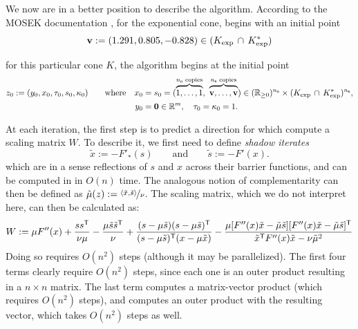 \begin{subappendices}
\begin{lproof}
    We now are in a better position to describe the algorithm.
    According to the MOSEK documentation \parencite{dahl2022primal},
        for the exponential cone,
            begins with an initial point
        \[
            \mathbf v := (1.291, 0.805, -0.828) \in (K_{\exp} \,\cap\, K_{\exp}^*)
        \]

        for this particular cone $K$,
    the algorithm begins at the initial point
    \begin{align*}
        z_0 := (y_0, x_0, \tau_0, s_0, \kappa_0)
        \qquad
                    \text{where}\quad
                x_0 &= s_0 = (\overbrace{\vphantom| 1, \ldots, 1}^{n_{\sf o} \text{ copies}},~
                    \overbrace{\vphantom|
                        \mat v, \ldots, \mat v}^{n_{\sf e}\text{ copies}})
                \in (\mathbb R_{\ge 0})^{n_{\sf o}} \times (K_{\exp} \,\cap\, K_{\exp}^*)^{n_{\sf e}}, \\
            \qquad
                y_0 &= \mat 0  \in \mathbb R^m,
            \quad
                \tau_0 = \kappa_0 = 1.
    \end{align*}

    \def\daff#1{\Delta {#1}^{\text{aff}}}
    \def\dcen#1{\Delta {#1}^{\text{cen}}}

    At each iteration, the first step is to predict a direction for which
    \textcite{badenbroek2021algorithm}
    compute a scaling matrix $W$.
    To describe it, we first need to define \emph{shadow iterates}
    \[
        \tilde x := -F'_*(s)
        \qquad \text{and} \qquad
        \tilde s := - F'(x).
    \]
    which are in a sense reflections of $s$ and $x$ across their barrier functions, and can be computed in in $O(n)$ time.
    The analogous notion of complementarity can then be defined as $\tilde \mu(z) := \nicefrac{\langle \tilde x, \tilde s \rangle}{\nu}$.
    The scaling matrix, which we do not interpret here, can then be calculated as:
    \begin{equation}
        W :=
            \mu F''(x) + \frac{s s^{\sf T}}{\nu \mu}
            - \frac{\mu \tilde s \tilde s^{\sf T}}{\nu}
            + \frac{(s- \mu\tilde s)(s-\mu\tilde s)^{\sf T}}
                    {(s-\mu\tilde s)^{\sf T} (x - \mu \tilde x) }
            - \frac{\mu [ F''(x) \tilde x - \tilde \mu \tilde s]
                [ F''(x) \tilde x - \tilde \mu \tilde s]^{\sf T}}
                { \tilde x^{\sf T} F''(x) \tilde x - \nu \tilde \mu^2}
        \label{eq:scalemat}
    \end{equation}
    Doing so requires $O(n^2)$ steps (although it may be parallelized).
    The first four terms clearly require $O(n^2)$ steps, since each one is an outer product resulting in a $n \times n$ matrix.
    The last term computes a matrix-vector product (which requires $O(n^2)$ steps), and computes an outer product with the resulting vector, which takes $O(n^2)$ steps as well.


\end{lproof}
\end{subappendices}
